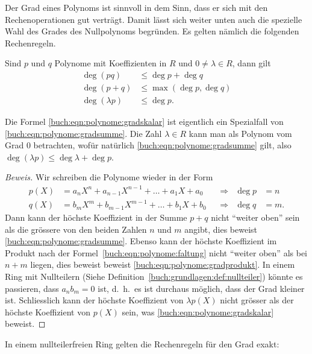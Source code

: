 Der Grad eines Polynoms ist sinnvoll in dem Sinn, dass er sich mit
den Rechenoperationen gut verträgt.
Damit lässt sich weiter unten auch die spezielle Wahl des Grades
des Nullpolynoms begründen.
Es gelten nämlich die folgenden Rechenregeln.

\begin{lemma}
\label{lemma:rechenregelnfuerpolynomgrad}
Sind $p$ und $q$ Polynome mit Koeffizienten in $R$ und $0\ne \lambda\in R$,
dann gilt
\begin{align}
\deg(pq) &\le \deg p + \deg q
\label{buch:eqn:polynome:gradsumme}
\\
\deg(p+q) &\le \max(\deg p, \deg q)
\label{buch:eqn:polynome:gradprodukt}
\\
\deg(\lambda p) &\le \deg p.
\label{buch:eqn:polynome:gradskalar}
\end{align}
\end{lemma}

Die Formel \eqref{buch:eqn:polynome:gradskalar} ist eigentlich
ein Spezialfall von \eqref{buch:eqn:polynome:gradsumme}.
Die Zahl $\lambda\in R$ kann man als Polynom vom Grad $0$ betrachten,
wofür natürlich \eqref{buch:eqn:polynome:gradsumme} gilt, also
$\deg(\lambda p) \le \deg\lambda + \deg p$.

\begin{proof}[Beweis]
Wir schreiben die Polynome wieder in der Form
\[
\begin{aligned}
p(X) &= a_nX^n + a_{n-1}X^{n-1} + \dots + a_1X + a_0&&\Rightarrow&\deg p&=n\\
q(X) &= b_mX^m + b_{m-1}X^{m-1} + \dots + b_1X + b_0&&\Rightarrow&\deg q&=m.
\end{aligned}
\]
Dann kann der höchste Koeffizient in der Summe $p+q$ nicht ``weiter oben''
sein als die grössere von den beiden Zahlen $n$ und $m$ angibt, dies
beweist \eqref{buch:eqn:polynome:gradsumme}.
Ebenso kann der höchste Koeffizient im Produkt nach der
Formel~\eqref{buch:eqn:polynome:faltung} nicht ``weiter oben'' als bei
$n+m$ liegen, dies beweist
beweist \eqref{buch:eqn:polynome:gradprodukt}.
In einem Ring mit Nullteilern
(Siehe Definition~\ref{buch:grundlagen:def:nullteiler})
könnte es passieren, dass $a_nb_m=0$ ist, d.~h.~es ist durchaus möglich,
dass der Grad kleiner ist.
Schliesslich kann der höchste Koeffizient von $\lambda p(X)$ nicht grösser
als der höchste Koeffizient von $p(X)$ sein, was
\eqref{buch:eqn:polynome:gradskalar} beweist.
\end{proof}

In einem nullteilerfreien Ring gelten die Rechenregeln für den Grad exakt:

